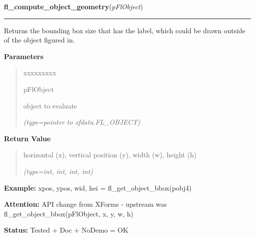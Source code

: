     \vspace{0.5ex}

\hspace{.8\funcindent}\begin{boxedminipage}{\funcwidth}

    \raggedright \textbf{fl\_compute\_object\_geometry}(\textit{pFlObject})

    \vspace{-1.5ex}

    \rule{\textwidth}{0.5\fboxrule}
\setlength{\parskip}{2ex}
    Returns the bounding box size that has the label, which could be drawn 
    outside of the object figured in.

\setlength{\parskip}{1ex}
      \textbf{Parameters}
      \vspace{-1ex}

      \begin{quote}
        \begin{Ventry}{xxxxxxxxx}

          \item[pFlObject]

          object to evaluate

            {\it (type=pointer to xfdata.FL\_OBJECT)}

        \end{Ventry}

      \end{quote}

      \textbf{Return Value}
    \vspace{-1ex}

      \begin{quote}
      horizontal (x), vertical position (y), width (w), height (h)

      {\it (type=int, int, int, int)}

      \end{quote}

\textbf{Example:} xpos, ypos, wid, hei = fl\_get\_object\_bbox(pobj4)



\textbf{Attention:} API change from XForms - upstream was fl\_get\_object\_bbox(pFlObject, x, 
y, w, h)



\textbf{Status:} Tested + Doc + NoDemo = OK



    \end{boxedminipage}

    \label{xformslib:flbasic:fl_call_object_callback}

